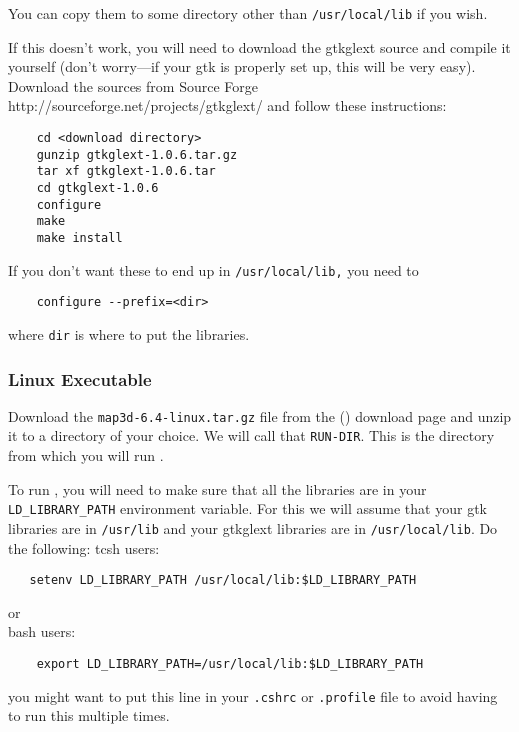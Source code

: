 You can copy them to some directory other than \texttt{/usr/local/lib} if
you wish.

If this doesn't work, you will need to download the gtkglext source and
compile it yourself (don't worry---if your gtk is properly set up, this
will be very easy).  Download the sources from Source Forge
{http://sourceforge.net/projects/gtkglext/} and follow these instructions:
%
\begin{verbatim}
    cd <download directory>
    gunzip gtkglext-1.0.6.tar.gz
    tar xf gtkglext-1.0.6.tar
    cd gtkglext-1.0.6
    configure
    make
    make install
\end{verbatim}

If you don't want these to end up in \texttt{/usr/local/lib,} you need to
%
\begin{verbatim}
    configure --prefix=<dir>
\end{verbatim}
%
where \texttt{dir} is where to put the libraries. 

\subsubsection{Linux Executable}

Download the \texttt{map3d-6.4-linux.tar.gz} file from the \map() download page
and unzip it to a directory of your choice.  We will call that
\texttt{RUN-DIR}. This is the directory from which you will run \map{}.

To run \map{}, you will need to make sure that all the libraries are in
your \verb|LD_LIBRARY_PATH| environment variable.  For this we will assume
that your gtk libraries are in \texttt{/usr/lib} and your gtkglext
libraries are in \texttt{/usr/local/lib}.  Do the following:
%
tcsh users:
\begin{verbatim}
   setenv LD_LIBRARY_PATH /usr/local/lib:$LD_LIBRARY_PATH
\end{verbatim}
or\\
%
bash users:
\begin{verbatim} 
    export LD_LIBRARY_PATH=/usr/local/lib:$LD_LIBRARY_PATH
\end{verbatim}

you might want to put this line in your \texttt{.cshrc} or
\texttt{.profile} file to avoid having to run this multiple times.

